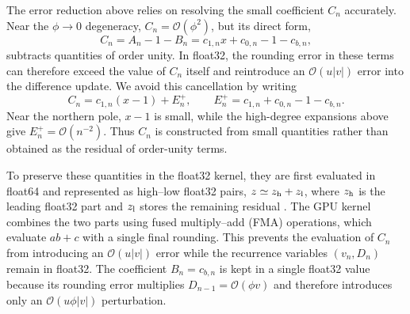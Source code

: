 \documentclass[letters,usenatbib,useAMS]{mnras}
\begin{document}

The error reduction above relies on resolving the small coefficient
$C_n$ accurately. Near the $\phi\rightarrow0$ degeneracy,
$C_n=\mathcal{O}(\phi^2)$, but its direct form,
\[
C_n=A_n-1-B_n
    =c_{1,n}x+c_{0,n}-1-c_{b,n},
\]
subtracts quantities of order unity. In float32, the rounding error in
these terms can therefore exceed the value of $C_n$ itself and reintroduce
an $\mathcal{O}(u|v|)$ error into the difference update. We avoid this
cancellation by writing
\begin{equation}
C_n=c_{1,n}(x-1)+E_n^+,
\qquad
E_n^+=c_{1,n}+c_{0,n}-1-c_{b,n}.
\end{equation}
Near the northern pole, $x-1$ is small, while the high-degree expansions above give $E_n^+=\mathcal{O}(n^{-2})$. Thus $C_n$ is constructed from
small quantities rather than obtained as the residual of order-unity
terms.

To preserve these quantities in the float32 kernel, they are first
evaluated in float64 and represented as high--low float32 pairs,
$z\simeq z_{\rm h}+z_{\rm l}$, where $z_{\rm h}$ is the leading float32
part and $z_{\rm l}$ stores the remaining residual
\citep{dekker1971}. The GPU kernel combines the two parts using fused
multiply--add (FMA) operations, which evaluate $ab+c$ with a single final
rounding. This prevents the evaluation of $C_n$ from introducing an
$\mathcal{O}(u|v|)$ error while the recurrence variables $(v_n,D_n)$
remain in float32. The coefficient $B_n=c_{b,n}$ is kept in a single
float32 value because its rounding error multiplies
$D_{n-1}=\mathcal{O}(\phi v)$ and therefore introduces only an
$\mathcal{O}(u\phi|v|)$ perturbation.
\end{document}

